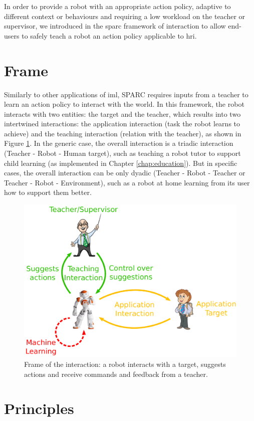 In order to provide a robot with an appropriate action policy, adaptive to different context or behaviours and requiring a low workload on the teacher or supervisor, we introduced in \cite{senft2015sparc} the \acrfull{sparc} framework of interaction to allow end-users to safely teach a robot an action policy applicable to \gls{hri}.
\section{Frame}

Similarly to other applications of \gls{iml}, SPARC requires inputs from a teacher to learn an action policy to interact with the world. In this framework, the robot interacts with two entities: the target and the teacher, which results into two intertwined interactions: the application interaction (task the robot learns to achieve) and the teaching interaction (relation with the teacher), as shown in Figure \ref{fig:frame}. In the generic case, the overall interaction is a triadic interaction (Teacher - Robot - Human target), such as teaching a robot tutor to support child learning (as implemented in Chapter \ref{chap:education}). But in specific cases, the overall interaction can be only dyadic (Teacher - Robot - Teacher or Teacher - Robot - Environment), such as a robot at home learning from its user how to support them better.

\begin{figure}[ht]
	\includegraphics[width=.8\linewidth]{frame.pdf}
	\centering
	\caption{Frame of the interaction: a robot interacts with a target, suggests actions and receive commands and feedback from a teacher.}
	\label{fig:frame}
\end{figure}

\section{Principles} \label{sec:sparc_principles}

